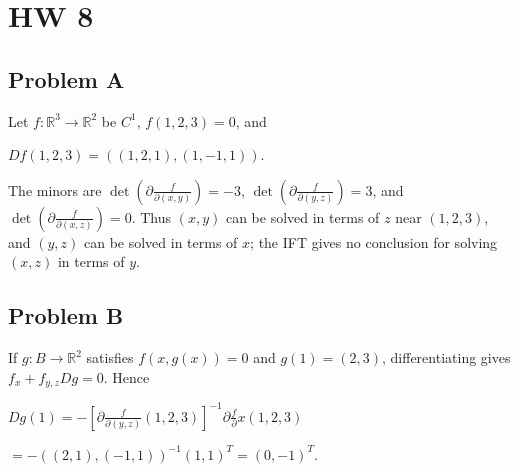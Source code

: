 \chapter{HW 8}

\section{Problem A}

Let \(f:\mathbb{R}^{3}\rightarrow\mathbb{R}^{2}\) be \(C^{1}\), \(f\left( {1,2,3} \right) = 0\), and

\(Df\left( {1,2,3} \right) = \left( {\left( {1,2,1} \right),\left( {1, - 1,1} \right)} \right).\)

The minors are \(\det\left( {\partial\frac{f}{\partial\left( {x,y} \right)}} \right) = - 3\), \(\det\left( {\partial\frac{f}{\partial\left( {y,z} \right)}} \right) = 3\), and \(\det\left( {\partial\frac{f}{\partial\left( {x,z} \right)}} \right) = 0\). Thus \(\left( {x,y} \right)\) can be solved in terms of \(z\) near \(\left( {1,2,3} \right)\), and \(\left( {y,z} \right)\) can be solved in terms of \(x\); the IFT gives no conclusion for solving \(\left( {x,z} \right)\) in terms of \(y\).

\section{Problem B}

If \(g:B\rightarrow\mathbb{R}^{2}\) satisfies \(f\left( {x,g(x)} \right) = 0\) and \(g(1) = \left( {2,3} \right)\), differentiating gives \(f_{x} + f_{y,z}Dg = 0\). Hence

\(Dg(1) = - \left\lbrack {\partial\frac{f}{\partial\left( {y,z} \right)}\left( {1,2,3} \right)} \right\rbrack^{- 1}\partial\frac{f}{\partial}x\left( {1,2,3} \right)\)

\(= - \left( {\left( {2,1} \right),\left( {- 1,1} \right)} \right)^{- 1}\left( {1,1} \right)^{T} = \left( {0, - 1} \right)^{T}.\)
